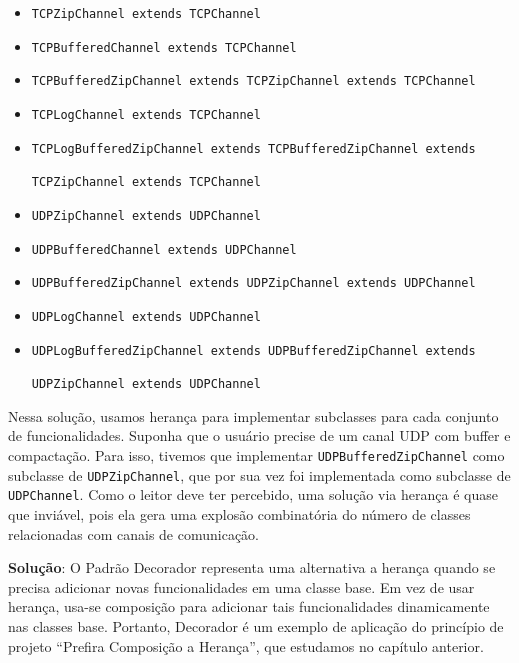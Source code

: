 \documentclass[
  11pt,
  twoside]{book}
\newcommand{\passthrough}[1]{#1}
\begin{document}
\begin{itemize}
\item
  \passthrough{\lstinline!TCPZipChannel extends TCPChannel!}
\item
  \passthrough{\lstinline!TCPBufferedChannel extends TCPChannel!}
\item
  \passthrough{\lstinline!TCPBufferedZipChannel extends TCPZipChannel extends TCPChannel!}
\item
  \passthrough{\lstinline!TCPLogChannel extends TCPChannel!}
\item
  \passthrough{\lstinline!TCPLogBufferedZipChannel extends TCPBufferedZipChannel extends!}

  \passthrough{\lstinline!TCPZipChannel extends TCPChannel!}
\item
  \passthrough{\lstinline!UDPZipChannel extends UDPChannel!}
\item
  \passthrough{\lstinline!UDPBufferedChannel extends UDPChannel!}
\item
  \passthrough{\lstinline!UDPBufferedZipChannel extends UDPZipChannel extends UDPChannel!}
\item
  \passthrough{\lstinline!UDPLogChannel extends UDPChannel!}
\item
  \passthrough{\lstinline!UDPLogBufferedZipChannel extends UDPBufferedZipChannel extends!}

  \passthrough{\lstinline!UDPZipChannel extends UDPChannel!}
\end{itemize}

Nessa solução, usamos herança para implementar subclasses para cada
conjunto de funcionalidades. Suponha que o usuário precise de um canal
UDP com buffer e compactação. Para isso, tivemos que implementar
\passthrough{\lstinline!UDPBufferedZipChannel!} como subclasse de
\passthrough{\lstinline!UDPZipChannel!}, que por sua vez foi
implementada como subclasse de \passthrough{\lstinline!UDPChannel!}.
Como o leitor deve ter percebido, uma solução via herança é quase que
inviável, pois ela gera uma explosão combinatória do número de classes
relacionadas com canais de comunicação.

\textbf{Solução}: O Padrão Decorador representa uma alternativa a
herança quando se precisa adicionar novas funcionalidades em uma classe
base. Em vez de usar herança, usa-se composição para adicionar tais
funcionalidades dinamicamente nas classes base. Portanto, Decorador é um
exemplo de aplicação do princípio de projeto ``Prefira Composição a
Herança'', que estudamos no capítulo anterior.
\end{document}
